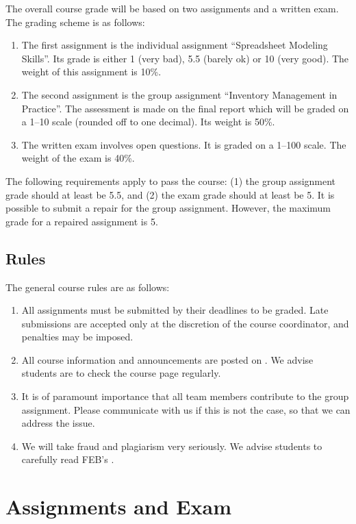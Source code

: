 \documentclass{article}
\begin{document}
The overall course grade will be based on two assignments and a written exam. The grading scheme is as follows: 
\begin{enumerate}
\item The first assignment is the individual assignment ``Spreadsheet Modeling Skills''. Its grade is either 1 (very bad), 5.5 (barely ok) or 10 (very good). The weight of this assignment is 10\%.
\item The second assignment is the group assignment ``Inventory Management in Practice''. The assessment is made on the final report which will be graded on a 1--10 scale (rounded off to one decimal). Its weight is 50\%. 
\item The written exam involves open questions. It is graded on a 1--100 scale. The weight of the exam is 40\%. 
\end{enumerate}

The following requirements apply to pass the course: (1) the group assignment grade should at least be 5.5, and (2) the exam grade should at least be 5. It is possible to submit a repair for the group assignment. However, the maximum grade for a repaired assignment is 5.

\subsection{Rules}

The general course rules are as follows:
\begin{enumerate}
\item All assignments must be submitted by their deadlines to be graded. Late submissions are accepted only at the discretion of the course coordinator, and penalties may be imposed. 
\item All course information and announcements are posted on \nestor. We advise students are to check the course page regularly.
\item It is of paramount importance that all team members contribute to the group assignment. Please communicate with us if this is not the case, so that we can address the issue. 
\item We will take fraud and plagiarism very seriously. We advise students to carefully read FEB's \policy.
\end{enumerate}

 
\section{Assignments and Exam}
\end{document}
